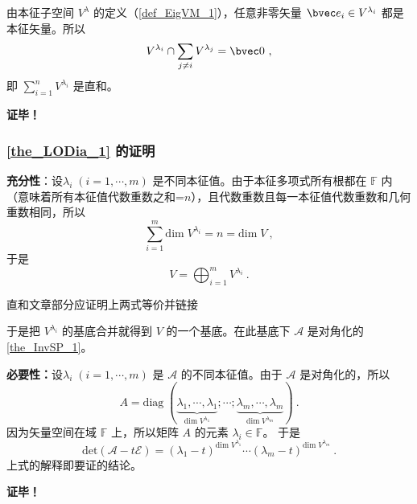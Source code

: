 由本征子空间 $V^\lambda$ 的定义（\autoref{def_EigVM_1}），任意非零矢量 $\bvec e_i\in V^{\lambda _i}$ 都是本征矢量。所以
\begin{equation}
V^{\lambda_i}\cap\sum_{j\neq i}V^{\lambda_j}=\bvec 0~,
\end{equation}
即  $\sum\limits_{i=1}^nV^{\lambda_i}$ 是直和。

\textbf{证毕！}
\subsubsection{\autoref{the_LODia_1} 的证明}
\textbf{充分性}：设$\lambda_i\;(i=1,\cdots, m)$ 是不同本征值。由于本征多项式所有根都在 $\mathbb{F}$ 内（意味着所有本征值代数重数之和=$n$），且代数重数且每一本征值代数重数和几何重数相同，所以
\begin{equation}
\sum_{i=1}^m \mathrm{dim}\;V^{\lambda_i}=n=\mathrm{dim}\; V~,
\end{equation}
于是
\begin{equation}
V=\bigoplus_{i=1}^m V^{\lambda_i}~.
\end{equation}
\begin{issues}
直和文章部分应证明上两式等价并链接
\end{issues}
于是把 $V^{\lambda_i}$ 的基底合并就得到 $V$ 的一个基底。在此基底下 $\mathcal{A}$ 是对角化的\autoref{the_InvSP_1}。

\textbf{必要性：}设$\lambda_i\;(i=1,\cdots, m)$ 是 $\mathcal A$ 的不同本征值。由于 $\mathcal A$ 是对角化的，所以
\begin{equation}
A=\mathrm{diag}\;(\underbrace{\lambda_1,\cdots,\lambda_1}_{\mathrm{dim}\;V^{\lambda_1}};\cdots;\underbrace{\lambda_m,\cdots,\lambda_m}_{\mathrm{dim}\;V^{\lambda_m}})~.
\end{equation}
因为矢量空间在域 $\mathbb{F}$ 上，所以矩阵 $A$ 的元素 $\lambda_i\in \mathbb{F}$。
于是
\begin{equation}
\mathrm{det}(\mathcal{A}-t\mathcal E)=(\lambda_1-t)^{\mathrm{dim}\;V^{\lambda_1}}\cdots(\lambda_m-t)^{\mathrm{dim}\;V^{\lambda_m}}~.
\end{equation}
上式的解释即要证的结论。

\textbf{证毕！}
